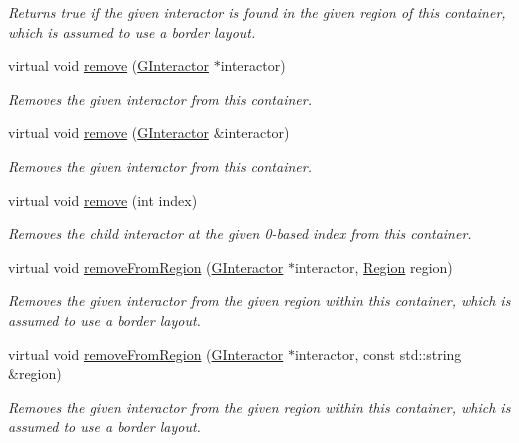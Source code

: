 \begin{DoxyCompactItemize}
\begin{DoxyCompactList}\small\item\em Returns true if the given interactor is found in the given region of this container, which is assumed to use a border layout. \end{DoxyCompactList}\item 
virtual void \mbox{\hyperlink{classGContainer_a1c12b1fde5c2ef10d79d4ee51e670efa}{remove}} (\mbox{\hyperlink{classGInteractor}{G\+Interactor}} $\ast$interactor)
\begin{DoxyCompactList}\small\item\em Removes the given interactor from this container. \end{DoxyCompactList}\item 
virtual void \mbox{\hyperlink{classGContainer_ade2376c458ac401a0bd2dbe44271509e}{remove}} (\mbox{\hyperlink{classGInteractor}{G\+Interactor}} \&interactor)
\begin{DoxyCompactList}\small\item\em Removes the given interactor from this container. \end{DoxyCompactList}\item 
virtual void \mbox{\hyperlink{classGContainer_a2ad1aa316f278b2e9fa8121504749652}{remove}} (int index)
\begin{DoxyCompactList}\small\item\em Removes the child interactor at the given 0-\/based index from this container. \end{DoxyCompactList}\item 
virtual void \mbox{\hyperlink{classGContainer_a87a74b040025878283ba685e30d5104f}{remove\+From\+Region}} (\mbox{\hyperlink{classGInteractor}{G\+Interactor}} $\ast$interactor, \mbox{\hyperlink{classGContainer_a81a01a86de31071a92e6cce0bab9bc4b}{Region}} region)
\begin{DoxyCompactList}\small\item\em Removes the given interactor from the given region within this container, which is assumed to use a border layout. \end{DoxyCompactList}\item 
virtual void \mbox{\hyperlink{classGContainer_a16268c8344a5a5d9b10bde95764112d1}{remove\+From\+Region}} (\mbox{\hyperlink{classGInteractor}{G\+Interactor}} $\ast$interactor, const std\+::string \&region)
\begin{DoxyCompactList}\small\item\em Removes the given interactor from the given region within this container, which is assumed to use a border layout. \end{DoxyCompactList}\item 

\end{DoxyCompactItemize}
